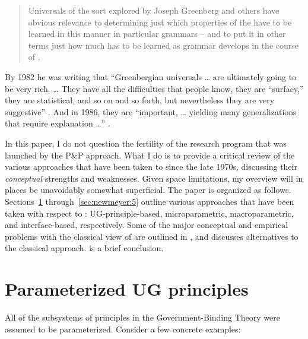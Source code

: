 \documentclass[output=paper,
modfonts
]{LSP/langsci}
\begin{document}
\begin{quote}
Universals of the sort explored by Joseph Greenberg and others have
obvious relevance to determining just which properties of the 
have to be learned in this manner in particular grammars  --  and to put
it in other terms just how much has to be learned as grammar develops in
the course of . \citep[95]{chomsky1981}
\end{quote}

By 1982 he was writing that ``Greenbergian universals {\ldots} are ultimately
going to be very rich. {\ldots} They have all the difficulties that people
know, they are ``surfacy,'' they are statistical, and so on and so
forth, but nevertheless they are very suggestive'' \citep[111]{chomsky1982}.
And in 1986, they are ``important, {\ldots} yielding many generalizations that
require explanation {\ldots}'' \citep[21]{chomsky1986}.

In this paper, I do not question the fertility of the research program
that was launched by the P\&P approach. What I do is to provide a
critical review of the various approaches that have been taken to
 since the late 1970s, discussing their \emph{conceptual}
strengths and weaknesses. Given space limitations, my overview will in
places be unavoidably somewhat superficial. The paper is organized as
follows. Sections~\ref{sec:newmeyer:2} through~\ref{sec:newmeyer:5} outline various approaches that have been
taken with respect to : UG-principle-based, microparametric,
macroparametric, and interface-based, respectively. Some of the 
major conceptual and empirical problems with the classical
view of  are outlined in , and  discusses alternatives to the classical
approach.  is a brief conclusion.

\section{Parameterized UG principles}\label{sec:newmeyer:2}

All of the subsystems of principles in the Government-Binding Theory
were assumed to be parameterized. Consider a few concrete examples:
\end{document}
